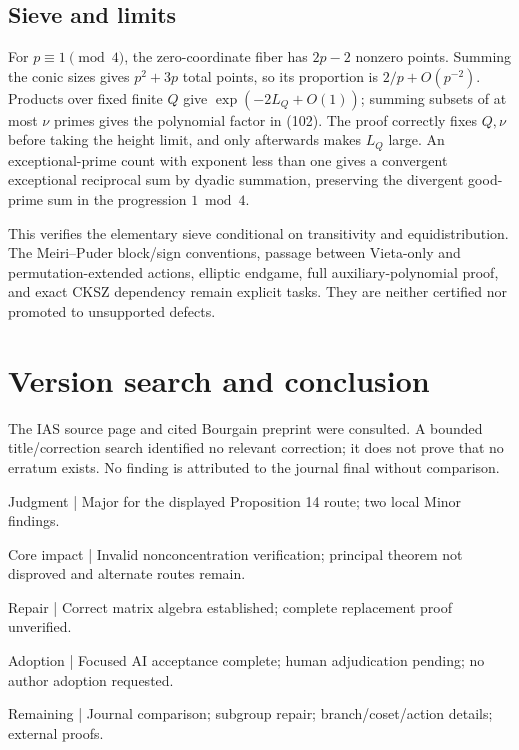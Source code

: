 \documentclass[10pt]{article}
\begin{document}
\subsection*{Sieve and limits}
For \(p\equiv1\pmod4\), the zero-coordinate fiber has \(2p-2\) nonzero points. Summing the conic sizes gives \(p^2+3p\) total points, so its proportion is \(2/p+O(p^{-2})\). Products over fixed finite \(Q\) give \(\exp(-2L_Q+O(1))\); summing subsets of at most \(\nu\) primes gives the polynomial factor in (102). The proof correctly fixes \(Q,\nu\) before taking the height limit, and only afterwards makes \(L_Q\) large. An exceptional-prime count with exponent less than one gives a convergent exceptional reciprocal sum by dyadic summation, preserving the divergent good-prime sum in the progression \(1\bmod4\).\par
This verifies the elementary sieve conditional on transitivity and equidistribution. The Meiri–Puder block/sign conventions, passage between Vieta-only and permutation-extended actions, elliptic endgame, full auxiliary-polynomial proof, and exact CKSZ dependency remain explicit tasks. They are neither certified nor promoted to unsupported defects.\par
\section*{Version search and conclusion}
The IAS source page and cited Bourgain preprint were consulted. A bounded title/correction search identified no relevant correction; it does not prove that no erratum exists. No finding is attributed to the journal final without comparison.\par
Judgment | Major for the displayed Proposition 14 route; two local Minor findings.\par
Core impact | Invalid nonconcentration verification; principal theorem not disproved and alternate routes remain.\par
Repair | Correct matrix algebra established; complete replacement proof unverified.\par
Adoption | Focused AI acceptance complete; human adjudication pending; no author adoption requested.\par
Remaining | Journal comparison; subgroup repair; branch/coset/action details; external proofs.\par
\end{document}
